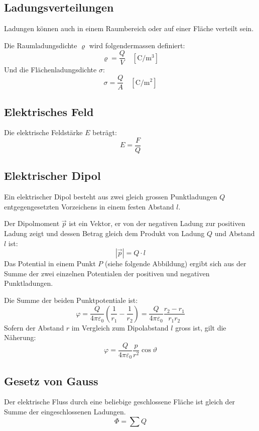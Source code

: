 \subsection{Ladungsverteilungen}

Ladungen können auch in einem Raumbereich oder auf einer Fläche verteilt sein.

Die Raumladungsdichte $\varrho$ wird folgendermassen definiert:
\[
	\varrho = \frac{Q}{V}
	\quad \left[ \textrm{C}/\textrm{m}^3 \right]
\]
Und die Flächenladungsdichte $\sigma$:
\[
	\sigma = \frac{Q}{A}
	\quad \left[ \textrm{C}/\textrm{m}^2 \right]
\]

\subsection{Elektrisches Feld}

Die elektrische Feldstärke $E$ beträgt:
\[
	E = \frac{F}{Q}
\]

\subsection{Elektrischer Dipol}

Ein elektrischer Dipol besteht aus zwei gleich grossen Punktladungen $Q$
entgegengesetzten Vorzeichens in einem festen Abstand $l$.

Der Dipolmoment $\vec{p}$ ist ein Vektor, er von der negativen Ladung zur
positiven Ladung zeigt und dessen Betrag gleich dem Produkt von Ladung $Q$ und
Abstand $l$ ist:
\[
	|\vec{p}| = Q \cdot l
\]
Das Potential in einem Punkt $P$ (siehe folgende Abbildung) ergibt sich aus der
Summe der zwei einzelnen Potentialen der positiven und negativen Punktladungen.

\begin{center}

\end{center}

Die Summe der beiden Punktpotentiale ist:
\[
	\varphi
		= \frac{Q}{4\pi\varepsilon_0} \left(\frac{1}{r_1} - \frac{1}{r_2}\right)
		= \frac{Q}{4\pi\varepsilon_0} \frac{r_2 - r_1}{r_1 r_2}
\]
Sofern der Abstand $r$ im Vergleich zum Dipolabstand $l$ gross ist, gilt die
Näherung:
\[
	\varphi = \frac{Q}{4\pi\varepsilon_0} \frac{p}{r^2} \cos \vartheta
\]

\subsection{Gesetz von Gauss}

Der elektrische Fluss durch eine beliebige geschlossene Fläche ist gleich der
Summe der eingeschlossenen Ladungen.
\[
	\Phi = \sum Q
\]

